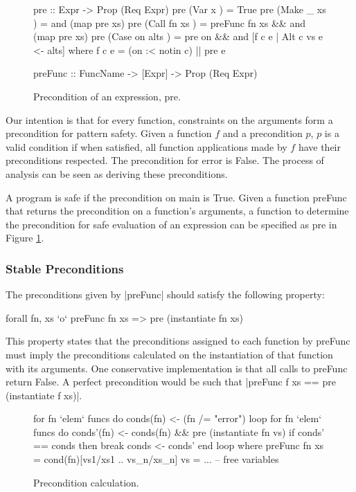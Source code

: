 \documentclass[preprint]{sigplanconf}
\newcommand{\C}[1]{\textsf{#1}}
\begin{document}
\begin{figure}
\begin{code}
pre :: Expr -> Prop (Req Expr)
pre (Var   x         ) = True
pre (Make  _   xs    ) = and (map pre xs)
pre (Call  fn  xs    ) = preFunc fn xs && and (map pre xs)
pre (Case  on  alts  ) = pre on && and [f c e | Alt c vs e <- alts]
    where f c e = (on :< notin c) || pre e

preFunc :: FuncName -> [Expr] -> Prop (Req Expr)
\end{code}
\caption{Precondition of an expression, \C{pre}.}
\label{fig:precondition}
\end{figure}

Our intention is that for every function, constraints on the arguments form a precondition for pattern safety. Given a function $f$ and a precondition $p$, $p$ is a valid condition if when satisfied, all function applications made by $f$ have their preconditions respected. The precondition for \C{error} is False. The process of analysis can be seen as deriving these preconditions.

A program is safe if the precondition on \C{main} is True. Given a function \C{preFunc} that returns the precondition on a function's arguments, a function to determine the precondition for safe evaluation of an expression can be specified as \C{pre} in Figure \ref{fig:precondition}.

\subsubsection{Stable Preconditions}

The preconditions given by |preFunc| should satisfy the following property:

\begin{code}
forall fn, xs `o` preFunc fn xs => pre (instantiate fn xs)
\end{code}

This property states that the preconditions assigned to each function by \C{preFunc} must imply the preconditions calculated on the instantiation of that function with its arguments. One conservative implementation is that all calls to \C{preFunc} return False. A perfect precondition would be such that |preFunc f xs == pre (instantiate f xs)|.

\begin{figure}
\begin{code}
for fn `elem` funcs do conds(fn) <- (fn /= "error")
loop
    for fn `elem` funcs do
        conds'(fn) <- conds(fn) && pre (instantiate fn vs)
    if conds' == conds then break
    conds <- conds'
end loop
    where
        preFunc fn xs = cond(fn)[vs1/xs1 .. vs_n/xs_n]
        vs = ... -- free variables
\end{code}
\caption{Precondition calculation.}
\label{fig:precond_fixp}
\end{figure}
\end{document}
